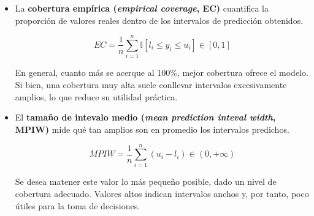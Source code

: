 \begin{itemize}
    \item La \textbf{cobertura empírica (\textit{empirical coverage}, EC)} cuantifica la proporción de valores
    reales dentro de los intervalos de predicción obtenidos. 
    
    $$
    EC = \frac{1}{n} \sum_{i=1}^n{ \mathbb{I} \left[ l_i \le y_i \le u_i \right] } \in \left[0, 1\right]
    $$

    En general, cuanto más se acerque al 100\%, mejor cobertura ofrece el modelo. Si bien, una cobertura muy 
    alta suele conllevar intervalos excesivamente amplios, lo que reduce su utilidad práctica.
    
    \item El \textbf{tamaño de intevalo medio (\textit{mean prediction inteval width}, MPIW)} mide qué tan 
    amplios son en promedio los intervalos predichos.
    
    $$
    MPIW = \frac{1}{n} \sum_{i=1}^n{ \left( u_i - l_i \right) } \in (0, +\infty)
    $$
    
    Se desea matener este valor lo más pequeño posible, dado un nivel de cobertura adecuado. Valores altos
    indican intervalos anchos y, por tanto, poco útiles para la toma de decisiones. 




    


\end{itemize}

